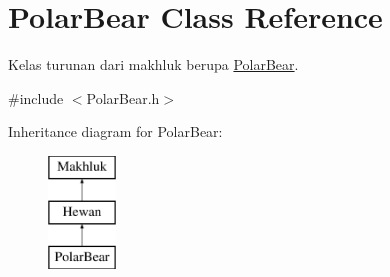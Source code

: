\hypertarget{class_polar_bear}{}\section{Polar\+Bear Class Reference}
\label{class_polar_bear}


Kelas turunan dari makhluk berupa \hyperlink{class_polar_bear}{Polar\+Bear}.  




{\ttfamily \#include $<$Polar\+Bear.\+h$>$}

Inheritance diagram for Polar\+Bear\+:\begin{figure}[H]
\begin{center}
\leavevmode
\includegraphics[height=3.000000cm]{class_polar_bear}
\end{center}
\end{figure}
